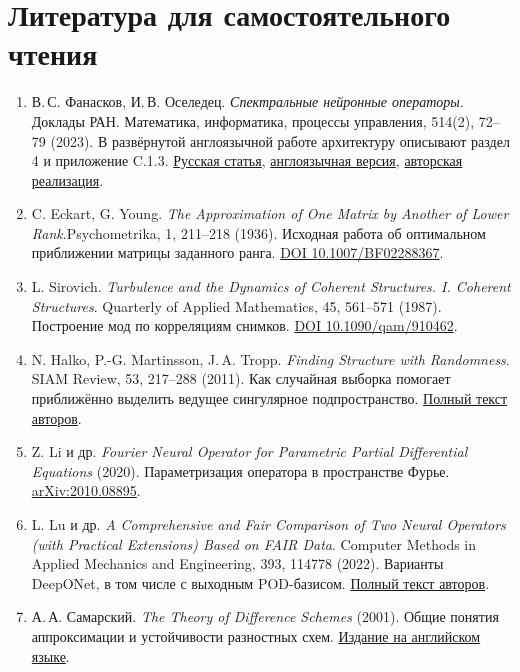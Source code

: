 \section{Литература для самостоятельного чтения}
\begin{enumerate}[itemsep=.45em]\RaggedRight
\item В.\,С. Фанасков, И.\,В. Оселедец. \emph{Спектральные нейронные операторы}.
Доклады РАН. Математика, информатика, процессы управления, 514(2),
72--79 (2023). В развёрнутой англоязычной работе архитектуру описывают
раздел 4 и приложение C.1.3. \href{https://www.mathnet.ru/rus/danma452}{Русская статья},
\href{https://arxiv.org/html/2205.10573v2}{англоязычная версия},
\href{https://github.com/VLSF/SNO/tree/4362226284f22f6f456d429ec4ddec5b8596e894}{авторская реализация}.
\item C. Eckart, G. Young. \emph{The Approximation of One Matrix by Another of
Lower Rank}.\newline Psychometrika, 1, 211--218 (1936). Исходная работа об
оптимальном приближении матрицы заданного ранга.
\href{https://doi.org/10.1007/BF02288367}{DOI 10.1007/BF02288367}.
\item L. Sirovich. \emph{Turbulence and the Dynamics of Coherent Structures.
I. Coherent Structures}. Quarterly of Applied Mathematics, 45, 561--571
(1987). Построение мод по корреляциям снимков.
\href{https://doi.org/10.1090/qam/910462}{DOI 10.1090/qam/910462}.
\item N. Halko, P.-G. Martinsson, J.\,A. Tropp.
\emph{Finding Structure with Randomness}. SIAM Review, 53, 217--288 (2011).
Как случайная выборка помогает приближённо выделить ведущее
сингулярное подпространство. \href{https://arxiv.org/abs/0909.4061}{Полный текст авторов}.
\item Z. Li и др. \emph{Fourier Neural Operator for Parametric Partial
Differential Equations} (2020). Параметризация оператора в пространстве
Фурье. \href{https://arxiv.org/abs/2010.08895}{arXiv:2010.08895}.
\item L. Lu и др. \emph{A Comprehensive and Fair Comparison of Two Neural
Operators (with Practical Extensions) Based on FAIR Data}. Computer Methods
in Applied Mechanics and Engineering, 393, 114778 (2022). Варианты
DeepONet, в том числе с выходным POD-базисом.
\href{https://arxiv.org/abs/2111.05512}{Полный текст авторов}.
\item А.\,А. Самарский. \emph{The Theory of Difference Schemes} (2001).
Общие понятия аппроксимации и устойчивости разностных схем.
\href{https://www.routledge.com/The-Theory-of-Difference-Schemes/Samarskii/p/book/9780429208171}{Издание на английском языке}.
\end{enumerate}

